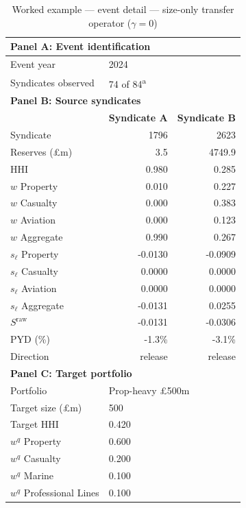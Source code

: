 \begin{table}[htbp]
\centering
\caption{Worked example --- event detail --- size-only transfer operator ($\gamma=0$)}
\label{tab:worked_example_event}
\begin{tabular}{lrr}
\toprule
\multicolumn{3}{l}{\textbf{Panel A: Event identification}} \\
\midrule
Event year & \multicolumn{2}{l}{2024} \\
Syndicates observed & \multicolumn{2}{l}{74 of 84\textsuperscript{a}} \\
\midrule
\multicolumn{3}{l}{\textbf{Panel B: Source syndicates}} \\
\midrule
 & \textbf{Syndicate A} & \textbf{Syndicate B} \\
\midrule
Syndicate & 1796 & 2623 \\
Reserves (\pounds m) & 3.5 & 4749.9 \\
HHI & 0.980 & 0.285 \\
  $w$ Property & 0.010 & 0.227 \\
  $w$ Casualty & 0.000 & 0.383 \\
  $w$ Aviation & 0.000 & 0.123 \\
  $w$ Aggregate & 0.990 & 0.267 \\
\midrule
  $s_\ell$ Property & -0.0130 & -0.0909 \\
  $s_\ell$ Casualty & 0.0000 & 0.0000 \\
  $s_\ell$ Aviation & 0.0000 & 0.0000 \\
  $s_\ell$ Aggregate & -0.0131 & 0.0255 \\
\midrule
$S^{\mathrm{raw}}$ & -0.0131 & -0.0306 \\
PYD (\%) & -1.3\% & -3.1\% \\
Direction & release & release \\
\midrule
\multicolumn{3}{l}{\textbf{Panel C: Target portfolio}} \\
\midrule
Portfolio & \multicolumn{2}{l}{Prop-heavy £500m} \\
Target size (\pounds m) & \multicolumn{2}{l}{500} \\
Target HHI & \multicolumn{2}{l}{0.420} \\
  $w^q$ Property & \multicolumn{2}{l}{0.600} \\
  $w^q$ Casualty & \multicolumn{2}{l}{0.200} \\
  $w^q$ Marine & \multicolumn{2}{l}{0.100} \\
  $w^q$ Professional Lines & \multicolumn{2}{l}{0.100} \\

\end{tabular}
\end{table}
